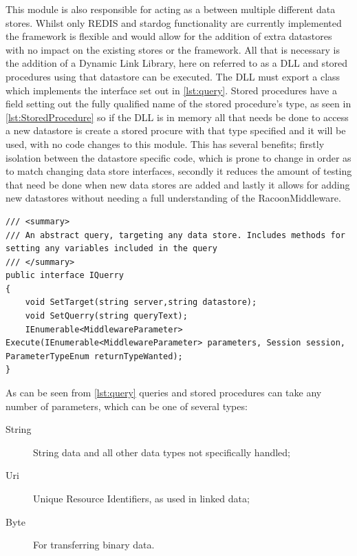 This module is also responsible for acting as a  between multiple different data stores. Whilst only REDIS and stardog functionality are currently implemented the framework is flexible and would allow for the addition of extra datastores with no impact on the existing stores or the framework. All that is necessary is the addition of a Dynamic Link Library, here on referred to as a DLL and stored procedures using that datastore can be executed. The DLL must export a class which implements the interface set out in \autoref{lst:query}. Stored procedures have a field setting out the fully qualified name of the stored procedure's type, as seen in \autoref{lst:StoredProcedure} so if the DLL is in memory all that needs be done to access a new datastore is create a stored procure with that type specified and it will be used, with no code changes to this module. This has several benefits; firstly isolation between the datastore specific code, which is prone to change in order as to match changing data store interfaces, secondly it reduces the amount of testing that need be done when new data stores are added and lastly it allows for adding new datastores without needing a full understanding of the RacoonMiddleware.

\begin{lstlisting}[language={[Sharp]C},frame=tb,caption={The IQuery interface, which must be implemented by all executable queries},label=lst:query]
/// <summary>
/// An abstract query, targeting any data store. Includes methods for setting any variables included in the query
/// </summary>
public interface IQuerry
{
    void SetTarget(string server,string datastore);
    void SetQuerry(string queryText);
    IEnumerable<MiddlewareParameter> Execute(IEnumerable<MiddlewareParameter> parameters, Session session, ParameterTypeEnum returnTypeWanted);      
}
\end{lstlisting}

As can be seen from \autoref{lst:query} queries and stored procedures can take any number of parameters, which can be one of several types:

\begin{description}
    \item[String] String data and all other data types not specifically handled;
    \item[Uri]  Unique Resource Identifiers, as used in linked data;
    \item[Byte] For transferring binary data.
\end{description}

